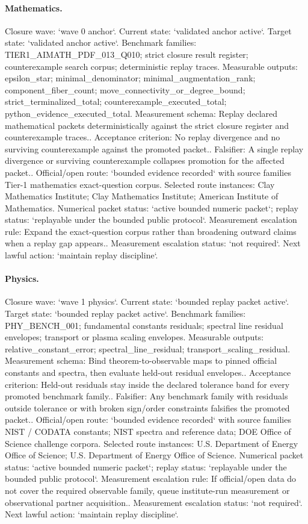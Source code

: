 \paragraph{Mathematics.}
Closure wave: `wave 0 anchor`. Current state: `validated anchor active`. Target state: `validated anchor active`.
Benchmark families: TIER1\_AIMATH\_PDF\_013\_Q010; strict closure result register; counterexample search corpus; deterministic replay traces.
Measurable outputs: epsilon\_star; minimal\_denominator; minimal\_augmentation\_rank; component\_fiber\_count; move\_connectivity\_or\_degree\_bound; strict\_terminalized\_total; counterexample\_executed\_total; python\_evidence\_executed\_total.
Measurement schema: Replay declared mathematical packets deterministically against the strict closure register and counterexample traces..
Acceptance criterion: No replay divergence and no surviving counterexample against the promoted packet..
Falsifier: A single replay divergence or surviving counterexample collapses promotion for the affected packet..
Official/open route: `bounded evidence recorded` with source families Tier-1 mathematics exact-question corpus.
Selected route instances: Clay Mathematics Institute; Clay Mathematics Institute; American Institute of Mathematics.
Numerical packet status: `active bounded numeric packet`; replay status: `replayable under the bounded public protocol`.
Measurement escalation rule: Expand the exact-question corpus rather than broadening outward claims when a replay gap appears..
Measurement escalation status: `not required`.
Next lawful action: `maintain replay discipline`.

\paragraph{Physics.}
Closure wave: `wave 1 physics`. Current state: `bounded replay packet active`. Target state: `bounded replay packet active`.
Benchmark families: PHY\_BENCH\_001; fundamental constants residuals; spectral line residual envelopes; transport or plasma scaling envelopes.
Measurable outputs: relative\_constant\_error; spectral\_line\_residual; transport\_scaling\_residual.
Measurement schema: Bind theorem-to-observable maps to pinned official constants and spectra, then evaluate held-out residual envelopes..
Acceptance criterion: Held-out residuals stay inside the declared tolerance band for every promoted benchmark family..
Falsifier: Any benchmark family with residuals outside tolerance or with broken sign/order constraints falsifies the promoted packet..
Official/open route: `bounded evidence recorded` with source families NIST / CODATA constants; NIST spectra and reference data; DOE Office of Science challenge corpora.
Selected route instances: U.S. Department of Energy Office of Science; U.S. Department of Energy Office of Science.
Numerical packet status: `active bounded numeric packet`; replay status: `replayable under the bounded public protocol`.
Measurement escalation rule: If official/open data do not cover the required observable family, queue institute-run measurement or observational partner acquisition..
Measurement escalation status: `not required`.
Next lawful action: `maintain replay discipline`.

